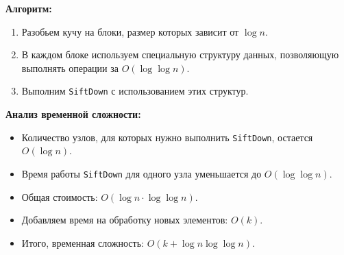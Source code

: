 \documentclass[11pt]{article}
\begin{document}
\begin{solution}
    \textbf{Алгоритм:}

    \begin{enumerate}
        \item Разобьем кучу на блоки, размер которых зависит от $\log n$.
        \item В каждом блоке используем специальную структуру данных, позволяющую выполнять операции за $O(\log \log n)$.
        \item Выполним \texttt{SiftDown} с использованием этих структур.
    \end{enumerate}

    \textbf{Анализ временной сложности:}

    \begin{itemize}
        \item Количество узлов, для которых нужно выполнить \texttt{SiftDown}, остается $O(\log n)$.
        \item Время работы \texttt{SiftDown} для одного узла уменьшается до $O(\log \log n)$.
        \item Общая стоимость: $O(\log n \cdot \log \log n)$.
        \item Добавляем время на обработку новых элементов: $O(k)$.
        \item Итого, временная сложность: $O(k + \log n \log \log n)$.
    \end{itemize}

\end{solution}
\end{document}
